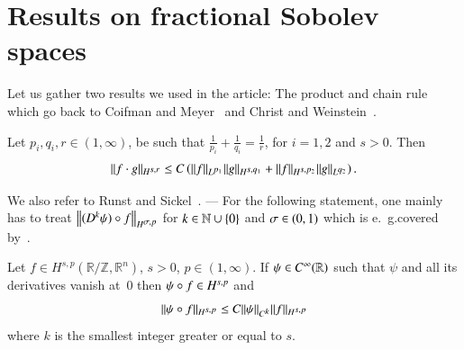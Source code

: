 \section{Results on fractional Sobolev spaces}\label{sect:fractional}

Let us gather two results we used in the article: The product and
chain rule which go back to Coifman and Meyer~\cite{CM} and Christ and Weinstein~\cite{CW}.

\begin{lemma}\label{lem:product}
  Let $p_i,q_i,r \in (1,\infty)$, be such that $\frac 1{p_i} + \frac 1 {q_i} = \frac 1r$, for $i=1,2$ and 
  $s > 0$. 
  Then 
 \begin{equation*}
  \|f\cdot g\|_{\W[s,r]} \leq C \left(\|f\|_{\Lp[p_1]} \|g\|_{\W[s,q_1]} + \|f\|_{\W[s,p_2]} \|g\|_{\Lp[q_2]} \right).
 \end{equation*}
\end{lemma}

We also refer to Runst and Sickel~{\cite[Lem.~5.3.7/1~(i)]{RS}}. ---
For the following statement, one mainly has to treat $\norm{(D^k\psi)\circ f}_{\W[\s,p]}$ for $k\in\N\cup\set0$ and $\s\in(0,1)$
which is e.~g.\@ covered by~\cite[Thm.~5.3.6/1~(i)]{RS}.

\begin{lemma}\label{lem:chain}
 Let $f\in H^{s,p}(\mathbb R / \mathbb Z, \mathbb R^n)$, $s > 0$, $p \in (1,\infty)$.
 If $\psi\in C^\infty(\R)$ such that $\psi$ and all its derivatives vanish at~$0$ then $\psi\circ f\in\W[s,p]$ and
 \[ \|\psi \circ f\|_{\W[s,p]} \le C\|\psi\|_{C^{\scriptstyle k}}\|f\|_{\W[s,p]} \]
 where $k$ is the smallest integer greater or equal to $s$.
\end{lemma}